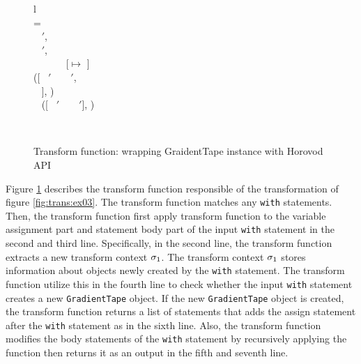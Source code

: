 \begin{figure}[ht!]
  \centering
  \begin{tabular}{l}
  \\
  \tstmt{\kwith ~ \mul{\nwithitem} ~ \kcolon ~ \mul{\nstmt}}{\smodenv} = \\
  \inden \ktlet ~ \mul{\nwithitem}$'$,  \kteq ~ \twwithitem{\mul{\nwithitem}}{\smodenv} \ktin \\
  \inden \ktlet ~ \mul{\nstmt}$'$,  \kteq ~  \ktin \\
  \inden \ktif ~  \envsub ~ \smodenv ~ \kteq ~ [\gtape $\mapsto$ \nid] ~ \ktthen\\
  \inden\inden ([\kwith ~ \mul{\nwithitem}$'$ ~ \kcolon ~ \mul{\nstmt}$'$, \\
  \inden\inden \nid ~ ], )\\
  \inden \ktelse ~ ([\kwith ~ \mul{\nwithitem}$'$ ~ \kcolon ~ \mul{\nstmt}$'$], )
\end{tabular}\\\vpar
  \caption{Transform function: wrapping GraidentTape instance with Horovod API}
  \label{fig:trans:fn03}
\end{figure}

Figure \ref{fig:trans:fn03} describes the transform function responsible of the
transformation of figure \ref{fig:trans:ex03}.
The transform function matches any {\tt with} statements.
Then, the transform function first apply transform function to the
variable assignment part and statement body part of the input {\tt with}
statement in the second and third line.
Specifically, in the second line, the transform function
extracts a new transform context $\sigma_{1}$.
The transform context $\sigma_{1}$ stores information about  
objects newly created by the {\tt with} statement.
The transform function utilize this in the fourth line to 
check whether the input {\tt with} statement creates
a new {\tt GradientTape} object.
If the new {\tt GradientTape} object is created,
the transform function returns a list of statements that adds the
assign statement after the {\tt with} statement as in the sixth line.
Also, the transform function modifies the body statements of the {\tt with} 
statement by recursively applying the \fkstmt function 
then returns it as an output in the fifth and seventh line.

